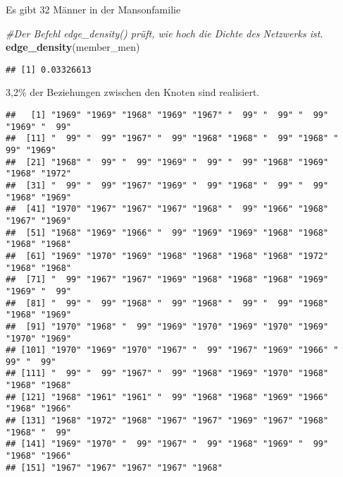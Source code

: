 \documentclass[
]{article}
\newenvironment{Shaded}{\begin{snugshade}}{\end{snugshade}}
\newcommand{\CommentTok}[1]{\textcolor[rgb]{0.56,0.35,0.01}{\textit{#1}}}
\newcommand{\KeywordTok}[1]{\textcolor[rgb]{0.13,0.29,0.53}{\textbf{#1}}}
\newcommand{\NormalTok}[1]{#1}
\newcommand{\OperatorTok}[1]{\textcolor[rgb]{0.81,0.36,0.00}{\textbf{#1}}}
\newcommand{\StringTok}[1]{\textcolor[rgb]{0.31,0.60,0.02}{#1}}
\begin{document}
Es gibt 32 Männer in der Mansonfamilie

\begin{Shaded}
\begin{Highlighting}[]
\CommentTok{#Der Befehl edge_density() prüft, wie hoch die Dichte des Netzwerks ist.}
\KeywordTok{edge_density}\NormalTok{(member_men)}
\end{Highlighting}
\end{Shaded}

\begin{verbatim}
## [1] 0.03326613
\end{verbatim}

3,2\% der Beziehungen zwischen den Knoten sind realisiert.

\begin{Shaded}
\end{Shaded}

\begin{verbatim}
##   [1] "1969" "1969" "1968" "1969" "1967" "  99" "  99" "  99" "1969" "  99"
##  [11] "  99" "  99" "1967" "  99" "1968" "1968" "  99" "1968" "  99" "1969"
##  [21] "1968" "  99" "  99" "1969" "  99" "  99" "1968" "1969" "1968" "1972"
##  [31] "  99" "  99" "1967" "1969" "  99" "1968" "  99" "  99" "1968" "1969"
##  [41] "1970" "1967" "1967" "1967" "1968" "  99" "1966" "1968" "1967" "1969"
##  [51] "1968" "1969" "1966" "  99" "1969" "1969" "1968" "1968" "1968" "1968"
##  [61] "1969" "1970" "1969" "1968" "1968" "1968" "1968" "1972" "1968" "1968"
##  [71] "  99" "1967" "1967" "1969" "1968" "1968" "1968" "1969" "1969" "  99"
##  [81] "  99" "  99" "1968" "  99" "1968" "  99" "  99" "1968" "1968" "1969"
##  [91] "1970" "1968" "  99" "1969" "1970" "1969" "1970" "1969" "1970" "1969"
## [101] "1970" "1969" "1970" "1967" "  99" "1967" "1969" "1966" "  99" "  99"
## [111] "  99" "  99" "1967" "  99" "1968" "1969" "1970" "1968" "1968" "1968"
## [121] "1968" "1961" "1961" "  99" "1968" "1968" "1969" "1966" "1968" "1966"
## [131] "1968" "1972" "1968" "1967" "1967" "1969" "1967" "1968" "1968" "  99"
## [141] "1969" "1970" "  99" "1967" "  99" "1968" "1969" "  99" "1968" "1966"
## [151] "1967" "1967" "1967" "1967" "1968"
\end{verbatim}
\end{document}
